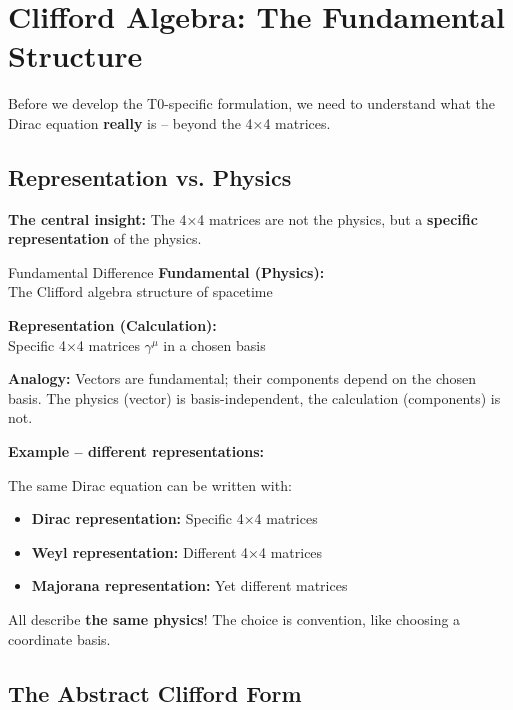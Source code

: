 \section{Clifford Algebra: The Fundamental Structure}
\label{sec:clifford_fundamentals}

Before we develop the T0-specific formulation, we need to understand what the Dirac equation \textbf{really} is – beyond the 4×4 matrices.

\subsection{Representation vs. Physics}
\label{subsec:representation_vs_physics}

\textbf{The central insight:} The 4×4 matrices are not the physics, but a \textbf{specific representation} of the physics.

\begin{important}{Fundamental Difference}
	\textbf{Fundamental (Physics):} \\
	The Clifford algebra structure of spacetime
	
	\textbf{Representation (Calculation):} \\
	Specific 4×4 matrices $\gamma^\mu$ in a chosen basis
	
	\vspace{0.3cm}
	
	\textbf{Analogy:} Vectors are fundamental; their components depend on the chosen basis. The physics (vector) is basis-independent, the calculation (components) is not.
\end{important}

\textbf{Example – different representations:}

The same Dirac equation can be written with:
\begin{itemize}
	\item \textbf{Dirac representation:} Specific 4×4 matrices
	\item \textbf{Weyl representation:} Different 4×4 matrices
	\item \textbf{Majorana representation:} Yet different matrices
\end{itemize}

All describe \textbf{the same physics}! The choice is convention, like choosing a coordinate basis.

\subsection{The Abstract Clifford Form}
\label{subsec:abstract_clifford}

